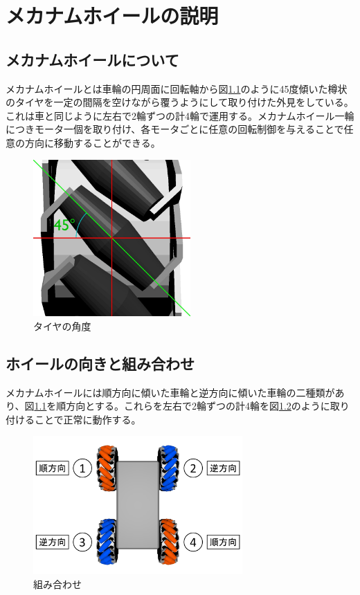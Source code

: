\documentclass[12pt,oneside]{sotsuken_paper}
\begin{document}
\chapter{メカナムホイールの説明}

	\section{メカナムホイールについて}
	メカナムホイールとは車輪の円周面に回転軸から図\ref{角度}のように45度傾いた樽状のタイヤを一定の間隔を空けながら覆うようにして取り付けた外見をしている。これは車と同じように左右で2輪ずつの計4輪で運用する。メカナムホイール一輪につきモータ一個を取り付け、各モータごとに任意の回転制御を与えることで任意の方向に移動することができる。

	\begin{figure}[htp]
		\begin{center}
			\includegraphics[width=60mm]{Image/角度.jpg}
			\caption{タイヤの角度}
			\label{角度}
		\end{center}
	\end{figure}

	\section{ホイールの向きと組み合わせ}
	メカナムホイールには順方向に傾いた車輪と逆方向に傾いた車輪の二種類があり、図\ref{角度}を順方向とする。これらを左右で2輪ずつの計4輪を図\ref{対角}のように取り付けることで正常に動作する。

	\begin{figure}[htp]
		\begin{center}
			\includegraphics[width=80mm]{Image/対角.png}
			\caption{組み合わせ}
			\label{対角}
		\end{center}
	\end{figure}
\end{document}
